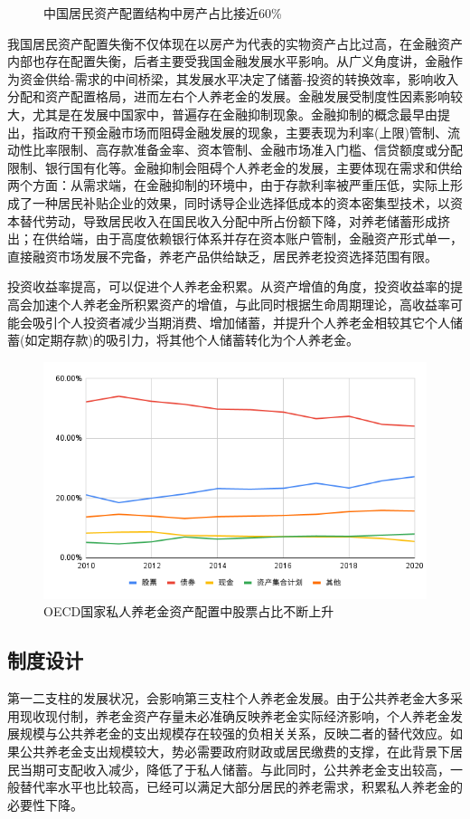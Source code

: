 \documentclass[a4paper,10.5pt]{ctexart}
\begin{document}
\begin{figure}[H]
\begin{minipage}{0.48\linewidth}
        \caption{中国居民资产配置结构中房产占比接近60\%}
    \end{minipage}
\end{figure}

我国居民资产配置失衡不仅体现在以房产为代表的实物资产占比过高，在金融资产内部也存在配置失衡，后者主要受我国金融发展水平影响。从广义角度讲，金融作为资金供给-需求的中间桥梁，其发展水平决定了储蓄-投资的转换效率，影响收入分配和资产配置格局，进而左右个人养老金的发展。金融发展受制度性因素影响较大，尤其是在发展中国家中，普遍存在金融抑制现象。金融抑制的概念最早由\citet{fishkin1973moral}提出，指政府干预金融市场而阻碍金融发展的现象，主要表现为利率(上限)管制、流动性比率限制、高存款准备金率、资本管制、金融市场准入门槛、信贷额度或分配限制、银行国有化等。金融抑制会阻碍个人养老金的发展，主要体现在需求和供给两个方面：从需求端，在金融抑制的环境中，由于存款利率被严重压低，实际上形成了一种居民补贴企业的效果，同时诱导企业选择低成本的资本密集型技术，以资本替代劳动，导致居民收入在国民收入分配中所占份额下降\cite{陈斌开2012金融抑制}，对养老储蓄形成挤出；在供给端，由于高度依赖银行体系并存在资本账户管制，金融资产形式单一，直接融资市场发展不完备，养老产品供给缺乏，居民养老投资选择范围有限。

投资收益率提高，可以促进个人养老金积累。从资产增值的角度，投资收益率的提高会加速个人养老金所积累资产的增值，与此同时根据生命周期理论，高收益率可能会吸引个人投资者减少当期消费、增加储蓄，并提升个人养老金相较其它个人储蓄(如定期存款)的吸引力，将其他个人储蓄转化为个人养老金。
\begin{figure}[H]
    \includegraphics[width=\linewidth]{img/OECD国家私人养老金资产配置中股票占比不断上升.png}
    \caption{OECD国家私人养老金资产配置中股票占比不断上升}
\end{figure}

\subsection{制度设计}
第一二支柱的发展状况，会影响第三支柱个人养老金发展。由于公共养老金大多采用现收现付制，养老金资产存量未必准确反映养老金实际经济影响，个人养老金发展规模与公共养老金的支出规模存在较强的负相关关系，反映二者的替代效应。如果公共养老金支出规模较大，势必需要政府财政或居民缴费的支撑，在此背景下居民当期可支配收入减少，降低了于私人储蓄。与此同时，公共养老金支出较高，一般替代率水平也比较高，已经可以满足大部分居民的养老需求，积累私人养老金的必要性下降。
\end{document}
